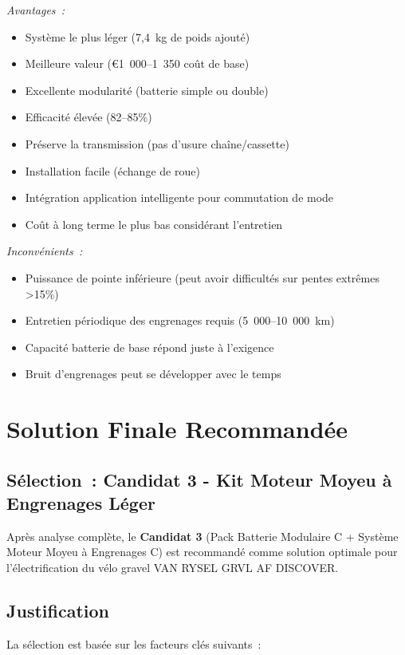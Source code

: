 \documentclass[12pt,a4paper]{article}
\begin{document}
\textit{Avantages~:}
\begin{itemize}
    \item Système le plus léger (7,4~kg de poids ajouté)
    \item Meilleure valeur (€1~000--1~350 coût de base)
    \item Excellente modularité (batterie simple ou double)
    \item Efficacité élevée (82--85\%)
    \item Préserve la transmission (pas d'usure chaîne/cassette)
    \item Installation facile (échange de roue)
    \item Intégration application intelligente pour commutation de mode
    \item Coût à long terme le plus bas considérant l'entretien
\end{itemize}

\textit{Inconvénients~:}
\begin{itemize}
    \item Puissance de pointe inférieure (peut avoir difficultés sur pentes extrêmes >15\%)
    \item Entretien périodique des engrenages requis (5~000--10~000~km)
    \item Capacité batterie de base répond juste à l'exigence
    \item Bruit d'engrenages peut se développer avec le temps
\end{itemize}

\section{Solution Finale Recommandée}

\subsection{Sélection~: Candidat 3 - Kit Moteur Moyeu à Engrenages Léger}

Après analyse complète, le \textbf{Candidat 3} (Pack Batterie Modulaire C + Système Moteur Moyeu à Engrenages C) est recommandé comme solution optimale pour l'électrification du vélo gravel VAN RYSEL GRVL AF DISCOVER.

\subsection{Justification}

La sélection est basée sur les facteurs clés suivants~:
\end{document}
